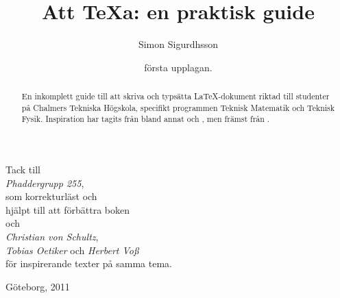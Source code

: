 \documentclass[swe,10pt,nofont]{skrapport}
\title{Att \TeX{}a: en praktisk guide}
\author{Simon Sigurdhsson}
\date{första upplagan.}
\makeatletter
\newcommand\frontmatter{%
  \cleardoublepage
  \pagenumbering{roman}}
\newcommand\mainmatter{%
  \cleardoublepage
  \pagenumbering{arabic}}
\renewenvironment{titlepage}{\cleardoublepage}{\thispagestyle{skrapport@titlepage}\cleardoublepage\setcounter{page}\@ne}
\let\@oldLaTeX\LaTeX
\def\LaTeX{\texorpdfstring{\@oldLaTeX}{LaTeX}}
\def\parsedate #1:2#2#3#4#5#6#7#8#9\empty{\ifx{#2}{9}19\else20\fi#3#4/#5#6/#7#8}
\newcommand\moddate[1][\jobname.tex]{\expandafter\parsedate\pdffilemoddate{#1}\empty}
\makeatother
\begin{document}
	\pagestyle{empty}
	
	\begin{titlepage} %
		\maketitle
		\begin{abstract}
			En inkomplett guide till att skriva och typsätta \LaTeX-dokument riktad
			till studenter på Chalmers Tekniska Högskola, specifikt programmen
			Teknisk Matematik och Teknisk Fysik.
			Inspiration har tagits från bland annat  och
			, men främst från .
		\end{abstract}
	\end{titlepage} %
	\cleardoublepage
	
	\begin{center} %
		\large\vspace*{36pt}
		
		{\makeatletter\@titstyle\makeatother\Large Tack till}\\[1ex]
		\emph{Phaddergrupp 255},\\
		som korrekturläst och\\
		hjälpt till att förbättra boken\\[1ex]
		{\makeatletter\@titstyle\makeatother\Large och}\\[1ex]
		\emph{Christian von Schultz},\\
		\emph{Tobias Oetiker} och \emph{Herbert Voß}\\
		för inspirerande texter på samma tema.
		\vfill 
		
		\small
		Göteborg, 2011
	\end{center}
	\cleardoublepage 
	
	\frontmatter
	\pagestyle{thefancy}
	\tableofcontents
	\cleardoublepage
	
	\mainmatter
\end{document}
